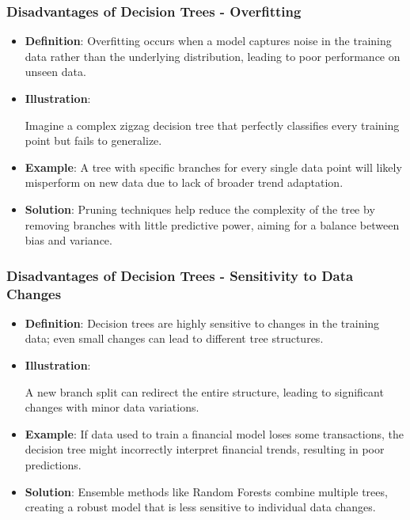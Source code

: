 \documentclass[aspectratio=169]{beamer}
\begin{document}
\begin{frame}[fragile]
    \frametitle{Disadvantages of Decision Trees - Overfitting}
    \begin{itemize}
        \item \textbf{Definition}: Overfitting occurs when a model captures noise in the training data rather than the underlying distribution, leading to poor performance on unseen data.
        
        \item \textbf{Illustration}: 
        \begin{block}{}
            Imagine a complex zigzag decision tree that perfectly classifies every training point but fails to generalize.
        \end{block}
        
        \item \textbf{Example}: A tree with specific branches for every single data point will likely misperform on new data due to lack of broader trend adaptation.
        
        \item \textbf{Solution}: Pruning techniques help reduce the complexity of the tree by removing branches with little predictive power, aiming for a balance between bias and variance.
    \end{itemize}
\end{frame}

\begin{frame}[fragile]
    \frametitle{Disadvantages of Decision Trees - Sensitivity to Data Changes}
    \begin{itemize}
        \item \textbf{Definition}: Decision trees are highly sensitive to changes in the training data; even small changes can lead to different tree structures.
        
        \item \textbf{Illustration}: 
        \begin{block}{}
            A new branch split can redirect the entire structure, leading to significant changes with minor data variations.
        \end{block}
        
        \item \textbf{Example}: If data used to train a financial model loses some transactions, the decision tree might incorrectly interpret financial trends, resulting in poor predictions.
        
        \item \textbf{Solution}: Ensemble methods like Random Forests combine multiple trees, creating a robust model that is less sensitive to individual data changes.
    \end{itemize}
\end{frame}
\end{document}

